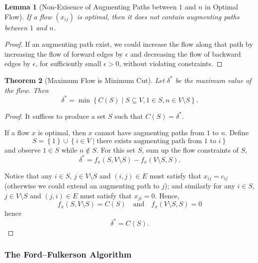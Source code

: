 \documentclass[11pt]{article}
\newtheorem{theorem}{Theorem}[section]
\newtheorem{lemma}[theorem]{Lemma}
\theoremstyle{definition}
\theoremstyle{remark}
\newcommand{\pqty}[1]{\left(#1\right)}
\newcommand{\Bqty}[1]{\left\{#1\right\}}
\newcommand{\set}[2]{\left\{#1\mid #2\right\}}
\newcommand{\qand}{\quad\text{and}\quad}
\begin{document}
\begin{lemma}[Non-Exisence of Augmenting Paths between \(1\) and \(n\) in Optimal Flow]\label{optim-unit-0082}
    If a flow \(\pqty{x_{ij}}\) is optimal, then it does not contain augmenting paths between \(1\) and \(n\).
\end{lemma}

\begin{proof}
    If an augmenting path exist, we could increase the flow along that path by increasing the flow of forward edges by \(\epsilon\) and decreasing the flow of backward edges by \(\epsilon\), for sufficiently small \(\epsilon > 0\), without violating constraints.
\end{proof}

\begin{theorem}[Maximum Flow is Minimum Cut]\label{optim-unit-0083}
    \label{thm:max-flow-min-cut}%
    Let \(\delta^{\ast}\) be the maximum value of the flow. Then
    \[
        \delta^{\ast} = \min \set{C \pqty{S}}{S \subseteq V, 1 \in S, n \in V \setminus S}.
    \]
\end{theorem}

\begin{proof}
    It suffices to produce a set \(S\) such that \(C\pqty{S} = \delta^{\ast}\).

    If a flow \(x\) is optimal, then \(x\) cannot have augmenting paths from \(1\) to \(n\). Define
    \[
        S = \Bqty{1} \cup \set{i \in V}{\text{there exists augmenting path from }1\text{ to }i}
    \]
    and observe \(1 \in S\) while \(n \notin S\). For this set \(S\), sum up the flow constraints of \(S\),
    \[
        \delta^{\ast} = f_x \pqty{S, V \setminus S} - f_x \pqty{V \setminus S, S}.
    \]

    Notice that any \(i \in S\), \(j \in V \setminus S\) and \(\pqty{i, j} \in E\) must satisfy that \(x_{ij} = c_{ij}\) (otherwise we could extend an augmenting path to \(j\)); and similarly for any \(i \in S\), \(j \in V \setminus S\) and \(\pqty{j, i} \in E\) must satisfy that \(x_{ji} = 0\). Hence,
    \[
        f_x \pqty{S, V \setminus S} = C\pqty{S} \qand f_x \pqty{V \setminus S, S} = 0
    \]
    hence
    \[
        \delta^{\ast} = C\pqty{S}.
    \]
\end{proof}

\subsubsection{The Ford--Fulkerson Algorithm}
\end{document}

